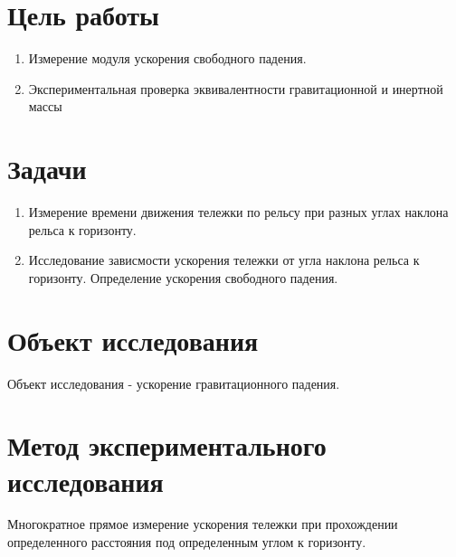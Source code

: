 \section{Цель работы}
\begin{enumerate}
    \item Измерение модуля ускорения свободного падения.
    \item Экспериментальная проверка эквивалентности гравитационной
        и инертной массы
\end{enumerate}

\section{Задачи}
\begin{enumerate}
    \item Измерение времени движения тележки по рельсу при разных
        углах наклона рельса к горизонту.
    \item Исследование зависмости ускорения тележки от угла наклона
        рельса к горизонту. Определение ускорения свободного падения.
\end{enumerate}

\section{Объект исследования}
Объект исследования - ускорение гравитационного падения.

\section{Метод экспериментального исследования}
Многократное прямое измерение ускорения тележки при прохождении определенного
расстояния под определенным углом к горизонту.

